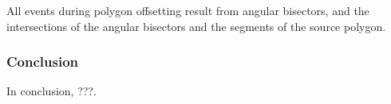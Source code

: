\documentclass[12pt,a4paper,oneside,openany]{article}
\begin{document}
All events during polygon offsetting result from angular bisectors, and the intersections of the angular bisectors and the segments of the source polygon.

\subsubsection{Conclusion}

In conclusion, ???.


\nocite{*}



\end{document}
